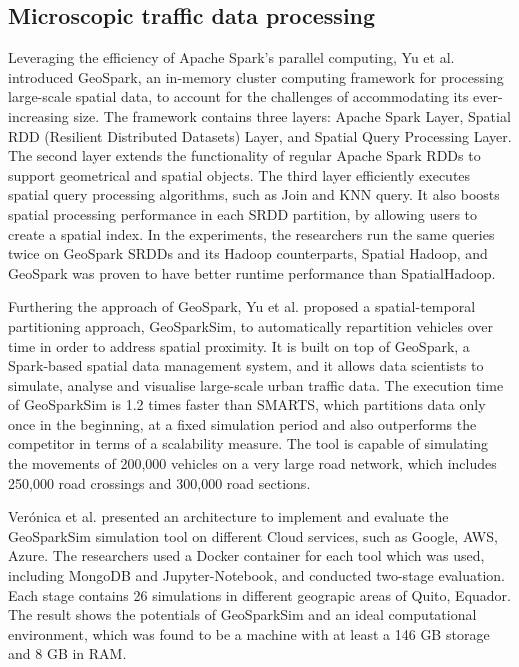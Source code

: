 \documentclass{article}
\begin{document}
\subsection{Microscopic traffic data processing}
\label{sec:microscopic}
Leveraging the efficiency of Apache Spark's parallel computing, Yu et al.\cite{10.1145/2820783.2820860} introduced GeoSpark, an in-memory cluster computing framework for processing large-scale spatial data, to account for the challenges of accommodating its ever-increasing size. The framework contains three layers: Apache Spark Layer, Spatial RDD (Resilient Distributed Datasets) Layer, and Spatial Query Processing Layer. The second layer extends the functionality of regular Apache Spark RDDs to support geometrical and spatial objects. The third layer efficiently executes spatial query processing algorithms, such as Join and KNN query. It also boosts spatial processing performance in each SRDD partition, by allowing users to create a spatial index. In the experiments, the researchers run the same queries twice on GeoSpark SRDDs and its Hadoop counterparts, Spatial Hadoop, and GeoSpark was proven to have better runtime performance than SpatialHadoop.

Furthering the approach of GeoSpark, Yu et al.\cite{yu2020dissecting} proposed a spatial-temporal partitioning approach, GeoSparkSim, to automatically repartition vehicles over time in order to address spatial proximity. It is built on top of GeoSpark, a Spark-based spatial data management system, and it allows data scientists to simulate, analyse and visualise large-scale urban traffic data. The execution time of GeoSparkSim is 1.2 times faster than SMARTS, which partitions data only once in the beginning, at a fixed simulation period and also outperforms the competitor in terms of a scalability measure. The tool is capable of simulating the movements of 200,000 vehicles on a very large road network, which includes 250,000 road crossings and 300,000 road sections. 

Verónica et al.\cite{10.1007/978-981-16-4126-8_24} presented an architecture to implement and evaluate the GeoSparkSim simulation tool on different Cloud services, such as Google, AWS, Azure. The researchers used a Docker container for each tool which was used, including MongoDB and Jupyter-Notebook, and conducted two-stage evaluation. Each stage contains 26 simulations in different geograpic areas of Quito, Equador. The result shows the potentials of GeoSparkSim and an ideal computational environment, which was found to be a machine with at least a 146 GB storage and 8 GB in RAM. 
\end{document}
